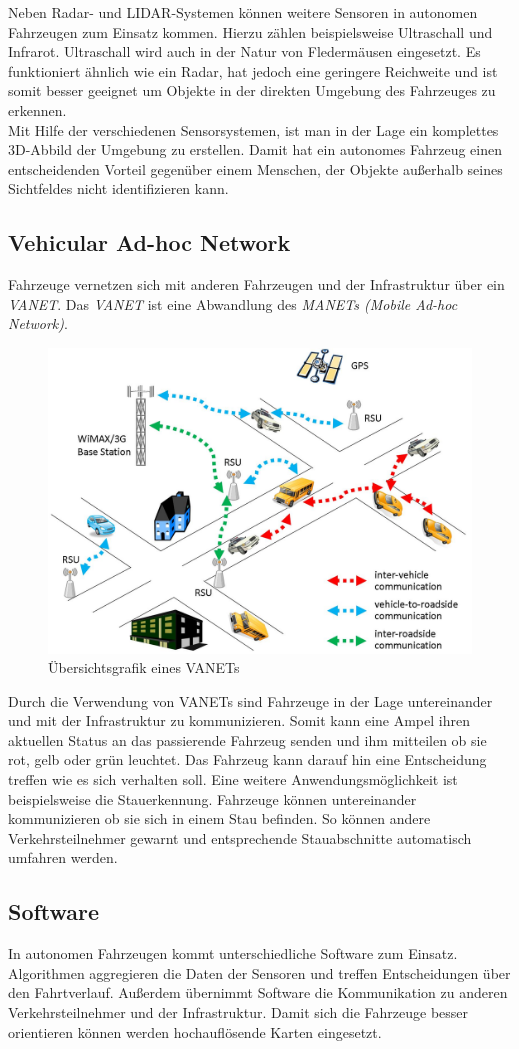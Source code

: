 Neben Radar- und LIDAR-Systemen können weitere Sensoren in autonomen Fahrzeugen zum Einsatz kommen. Hierzu zählen beispielsweise Ultraschall und Infrarot.
Ultraschall wird auch in der Natur von Fledermäusen eingesetzt. Es funktioniert ähnlich wie ein Radar, hat jedoch eine geringere Reichweite und ist somit besser geeignet um Objekte in der direkten Umgebung des Fahrzeuges zu erkennen.\\

Mit Hilfe der verschiedenen Sensorsystemen, ist man in der Lage ein komplettes 3D-Abbild der Umgebung zu erstellen. Damit hat ein autonomes Fahrzeug einen entscheidenden Vorteil gegenüber einem Menschen, der Objekte außerhalb seines Sichtfeldes nicht identifizieren kann.\\

\subsection{Vehicular Ad-hoc Network}

Fahrzeuge vernetzen sich mit anderen Fahrzeugen und der Infrastruktur über ein \textit{VANET}. Das \textit{VANET} ist eine Abwandlung des \textit{MANETs (Mobile Ad-hoc Network)}. 

\begin{figure}[H]
    \centering
    \includegraphics[width=.485\textwidth]{resources/images/vanet.jpg}
    \caption{Übersichtsgrafik eines VANETs \cite{vanet}}
\end{figure}

Durch die Verwendung von VANETs sind Fahrzeuge in der Lage untereinander und mit der Infrastruktur zu kommunizieren. Somit kann eine Ampel ihren aktuellen Status an das passierende Fahrzeug senden und ihm mitteilen ob sie rot, gelb oder grün leuchtet. Das Fahrzeug kann darauf hin eine Entscheidung treffen wie es sich verhalten soll. Eine weitere Anwendungsmöglichkeit ist beispielsweise die Stauerkennung. Fahrzeuge können untereinander kommunizieren ob sie sich in einem Stau befinden. So können andere Verkehrsteilnehmer gewarnt und entsprechende Stauabschnitte automatisch umfahren werden.

\subsection{Software}

In autonomen Fahrzeugen kommt unterschiedliche Software zum Einsatz. Algorithmen aggregieren die Daten der Sensoren und treffen Entscheidungen über den Fahrtverlauf. Außerdem übernimmt Software die Kommunikation zu anderen Verkehrsteilnehmer und der Infrastruktur. Damit sich die Fahrzeuge besser orientieren können werden hochauflösende Karten eingesetzt.